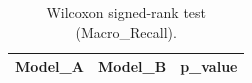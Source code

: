 \begin{table}[t]
\centering
\begin{tabular}{lll}
\toprule
Model_A & Model_B & p_value \\
\midrule
\bottomrule
\end{tabular}
\caption{Wilcoxon signed-rank test (Macro_Recall).}
\label{tab:wilcoxon_Macro_Recall}
\end{table}